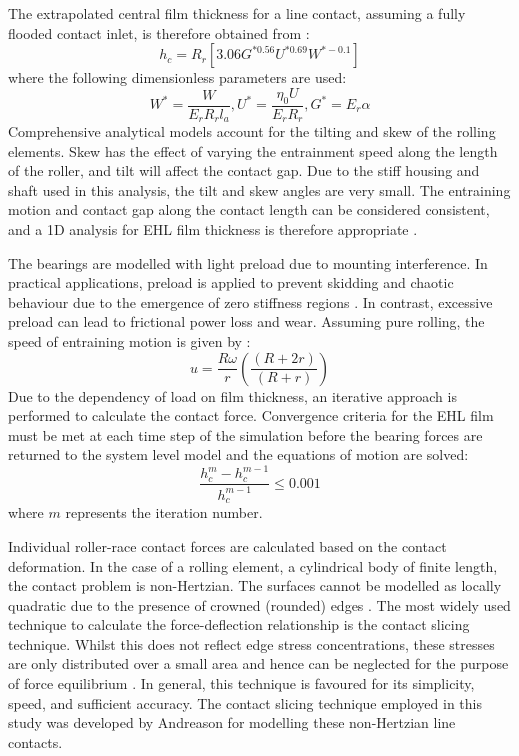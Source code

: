 The extrapolated central film thickness for a line contact, assuming a fully flooded contact inlet, is therefore obtained from \cite{Dowson1979}: 
\begin{equation}\label{DowsonToyodaCentralFilm}
	h_c=R_r\left[3.06 G^{* 0.56} U^{* 0.69} W^{*-0.1}\right]
\end{equation}
where the following dimensionless parameters are used:
\begin{equation}\label{DowsonToyodaDimensionless}
	W^*=\frac{W}{E_r R_r l_a}, U^*=\frac{\eta_0 U}{E_r R_r}, G^*=E_r \alpha
\end{equation}
Comprehensive analytical models \cite{Nelias2008} \cite{Majdoub2020} account for the tilting and skew of the rolling elements. Skew has the effect of varying the entrainment speed along the length of the roller, and tilt will affect the contact gap. Due to the stiff housing and shaft used in this analysis, the tilt and skew angles are very small. The entraining motion and contact gap along the contact length can be considered consistent, and a 1D analysis for EHL film thickness is therefore appropriate \cite{Gupta1979}.

The bearings are modelled with light preload due to mounting interference. In practical applications, preload is applied to prevent skidding and chaotic behaviour due to the emergence of zero stiffness regions \cite{Mevel1993}. In contrast, excessive preload can lead to frictional power loss and wear. Assuming pure rolling, the speed of entraining motion is given by \cite{Spikes2015} \cite{Shi2015}: 
\begin{equation}\label{SpikesEntrainmentSpeed}
	u=\frac{R \omega}{r}\left(\frac{(R+2 r)}{(R+r)}\right)
\end{equation}
Due to the dependency of load on film thickness, an iterative approach is performed to calculate the contact force. Convergence criteria for the EHL film must be met at each time step of the simulation before the bearing forces are returned to the system level model and the equations of motion are solved:
\begin{equation}\label{FilmConvergence}
	\frac{h_c^m-h_c^{m-1}}{h_c^{m-1}} \leq 0.001
\end{equation}
where $m$ represents the iteration number.

Individual roller-race contact forces are calculated based on the contact deformation. In the case of a rolling element, a cylindrical body of finite length, the contact problem is non-Hertzian. The surfaces cannot be modelled as locally quadratic due to the presence of crowned (rounded) edges \cite{Singh1974}. The most widely used technique to calculate the force-deflection relationship is the contact slicing technique. Whilst this does not reflect edge stress concentrations, these stresses are only distributed over a small area and hence can be neglected for the purpose of force equilibrium \cite{Harris2007a}. In general, this technique is favoured for its simplicity, speed, and sufficient accuracy. The contact slicing technique employed in this study was developed by Andreason \cite{Andreason1973} for modelling these non-Hertzian line contacts.
 
